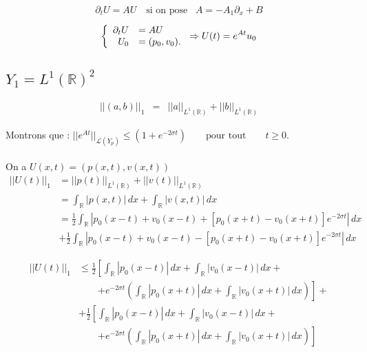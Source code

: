 \documentclass[a4paper,11pt]{article}
\begin{document}
\begin{displaymath}
    \partial_t U = AU \,\,\,\,\,\, \mbox{si on pose}\,\,\,\,\, A=-A_1\partial_x + B
\end{displaymath}

\begin{displaymath}
    \left\{
    \begin{array}{rl}
        \partial_t U &=AU\\
        U_0 &=(p_0,v_0).
        \end{array}
    \right.
    \Rightarrow \\
    U(t) = e^{At} u_{0}
\end{displaymath}

\subsection{\( Y_{1} = L^{1}(\mathbb{R})^{2} \)}

\begin{equation*}
\begin{array}{rcl}
    ||(a,b)||_{1} &=& ||a||_{L^{1}(\mathbb{R})} + ||b||_{L^{1}(\mathbb{R})}
\end{array}
\end{equation*}

Montrons que :
\( ||e^{At}||_{\mathcal{L}(Y_p)}\leq (1+e^{-2\sigma t}) \qquad \mbox{pour tout} \qquad t\geq 0. \)\\ \\
On a \( U(x,t)=(p(x,t),v(x,t)) \) \\

\begin{equation*}
\begin{split}
    ||U(t)||_1 &= ||p(t)||_{L^1(\mathbb{R})} + ||v(t)||_{L^1(\mathbb{R})} \\
    &= \int_{\mathbb{R}}{|p(x,t)|\,dx} + \int_{\mathbb{R}}{|v(x,t)|\,dx} \\
    &= \frac{1}{2} \int_{\mathbb{R}}|p_0(x-t)+v_0(x-t) + [p_0(x+t)-v_0(x+t)] e^{-2\sigma t} | \,dx \\
    & +\frac{1}{2} \int_{\mathbb{R}}|p_0(x-t)+v_0(x-t) - [p_0(x+t)-v_0(x+t)] e^{-2\sigma t} | \,dx
\end{split}
\end{equation*}

\begin{equation*}
\begin{split}
    ||U(t)||_1 & \le \frac{1}{2} \left[\int_{\mathbb{R}}|p_0(x-t)| \,dx + \int_{\mathbb{R}} |v_0(x-t)| \,dx + \right. \\
   & \qquad \left. + e^{-2\sigma t} \left( \int_{\mathbb{R}} |p_0(x+t)| \,dx + \int_{\mathbb{R}} |v_0(x+t)| \,dx \right) \right] + \\
   & + \frac{1}{2} \left[ \int_{\mathbb{R}}|p_0(x-t)| \,dx + \int_{\mathbb{R}} |v_0(x-t)| \,dx + \right. \\
   & \qquad \left. + e^{-2\sigma t} \left( \int_{\mathbb{R}} |p_0(x+t)| \,dx + \int_{\mathbb{R}} |v_0(x+t)| \,dx \right) \right]
\end{split}
\end{equation*}
\end{document}
